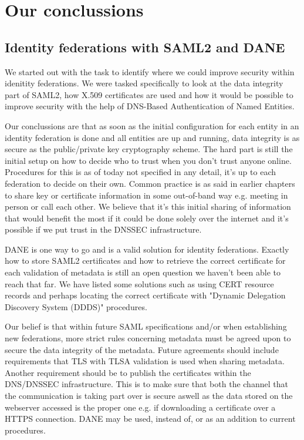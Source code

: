 \section{Our conclussions}
\subsection{Identity federations with SAML2 and DANE}
We started out with the task to identify where we could improve security within idenitity federations.
We were tasked specifically to look at the data integrity part of SAML2, how X.509 certificates are used and how it would be possible to improve security with the help of DNS-Based Authentication of Named Entities.

Our conclussions are that as soon as the initial configuration for each entity in an identity federation is done and all entities are up and running, data integrity is as secure as the public/private key cryptography scheme.
The hard part is still the initial setup on how to decide who to trust when you don't trust anyone online.
Procedures for this is as of today not specified in any detail, it's up to each federation to decide on their own.
Common practice is as said in earlier chapters to share key or certificate information in some out-of-band way e.g. meeting in person or call each other.
We believe that it's this initial sharing of information that would benefit the most if it could be done solely over the internet and it's possible if we put trust in the DNSSEC infrastructure.

DANE is one way to go and is a valid solution for identity federations.
Exactly how to store SAML2 certificates and how to retrieve the correct certificate for each validation of metadata is still an open question we haven't been able to reach that far.
We have listed some solutions such as using CERT resource records and perhaps locating the correct certificate with "Dynamic Delegation Discovery System (DDDS)" procedures.

Our belief is that within future SAML specifications and/or when establishing new federations, more strict rules concerning metadata must be agreed upon to secure the data integrity of the metadata.
Future agreements should include requirements that TLS with TLSA validation is used when sharing metadata.
Another requirement should be to publish the certificates within the DNS/DNSSEC infrastructure.
This is to make sure that both the channel that the communication is taking part over is secure aswell as the data stored on the webserver accessed is the proper one e.g. if downloading a certificate over a HTTPS connection.
DANE may be used, instead of, or as an addition to current procedures.

